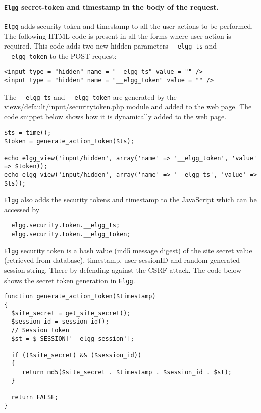 \paragraph{{\tt Elgg} secret-token and timestamp in the body of the request.}
{\tt Elgg} adds security token and timestamp to all the user actions to be performed.
The following HTML code is present in all the forms where user action is required. 
This code adds two new hidden parameters {\tt\_\_elgg\_ts} and {\tt\_\_elgg\_token} to the POST request:

\begin{lstlisting}
<input type = "hidden" name = "__elgg_ts" value = "" />
<input type = "hidden" name = "__elgg_token" value = "" />
\end{lstlisting}

The {\tt\_\_elgg\_ts} and {\tt\_\_elgg\_token} are generated by the 
\url{views/default/input/securitytoken.php} 
module and added to the web page. 
The code snippet below shows how it is dynamically added to the web page.
{\footnotesize
\begin{lstlisting}
$ts = time();
$token = generate_action_token($ts);

echo elgg_view('input/hidden', array('name' => '__elgg_token', 'value' => $token));
echo elgg_view('input/hidden', array('name' => '__elgg_ts', 'value' => $ts));
\end{lstlisting}
}

{\tt Elgg} also adds the security tokens and timestamp to the JavaScript which can be accessed by 

\begin{lstlisting}
  elgg.security.token.__elgg_ts;
  elgg.security.token.__elgg_token;
\end{lstlisting}

{\tt Elgg} security token is a hash value (md5 message digest) of the site secret value (retrieved from database),
timestamp, user sessionID and random generated session string. There by defending against the CSRF attack.  
The code below shows the secret token generation in {\tt Elgg}.

\begin{lstlisting}
function generate_action_token($timestamp) 
{
  $site_secret = get_site_secret();
  $session_id = session_id();
  // Session token
  $st = $_SESSION['__elgg_session'];

  if (($site_secret) && ($session_id)) 
  {
     return md5($site_secret . $timestamp . $session_id . $st);
  }

  return FALSE;
}
\end{lstlisting}


